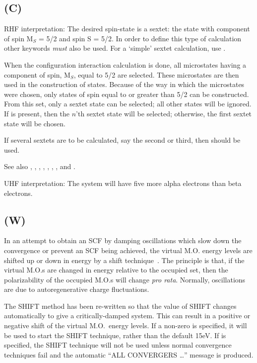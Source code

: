 \subsection*{ (C)}
        RHF interpretation:  The desired spin-state is a sextet:  the  state
   with component of spin M$_S$ = 5/2 and spin S = 5/2.
In order to define this type of calculation
other keywords {\em must} also be used.  For a `simple' sextet  calculation,
use .


 When the configuration interaction calculation is done, all microstates having
a component of spin,  M$_S$, equal to 5/2 are selected.  These microstates are then
used in the construction of states.  Because of the way in which the microstates
were chosen, only states of spin equal to or greater than 5/2 can be constructed.
From this set, only a sextet  state can be selected; all other states will be ignored.
If  is present, then the $n$'th sextet  state will be selected;
otherwise, the first sextet  state will be  chosen.

     If several sextets are to be calculated, say the second
   or third, then  should be used.

See also , , , , ,
, ,  and .

        UHF interpretation:  The system will have five more alpha  electrons
   than beta electrons.

\subsection*{ (W)}
        In an attempt to obtain an SCF by damping  oscillations  which  slow
   down  the  convergence or prevent an SCF being achieved, the virtual M.O.
   energy levels are shifted up or down in energy by a shift technique~\cite{shift}.
   The
   principle is that, if the virtual M.O.s are changed in energy relative to
   the occupied set, then the polarizability of  the  occupied  M.O.s  will
   change  {\em pro  rata}.   Normally,  oscillations  are due to autoregenerative
   charge fluctuations.

        The SHIFT method has been re-written so  that  the  value  of  SHIFT
   changes  automatically  to  give  a  critically-damped  system.  This can
   result in a positive or  negative  shift  of  the  virtual  M.O.\  energy
   levels.   If  a non-zero  is specified, it will be used to start the
   SHIFT technique, rather than the default 15eV.  If  is  specified,
   the SHIFT technique will not be used unless normal convergence techniques
   fail and the automatic ``ALL CONVERGERS \ldots'' message is produced.

